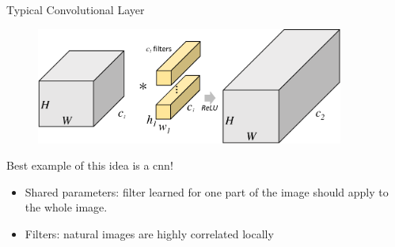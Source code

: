 \documentclass[t,xcolor=dvipsnames]{beamer}
\begin{document}
\begin{frame}{Typical Convolutional Layer}
\begin{figure}
   \includegraphics[width=0.9\textwidth, page=1]{../Figs/PDF/groupfig}
\end{figure}
    Best example of this idea is a \gls{cnn}!
    \begin{itemize}
        \item Shared parameters: filter learned for one part of the image should apply to the whole image.
        \item Filters: natural images are highly correlated locally
    \end{itemize}

\end{frame}
\end{document}
